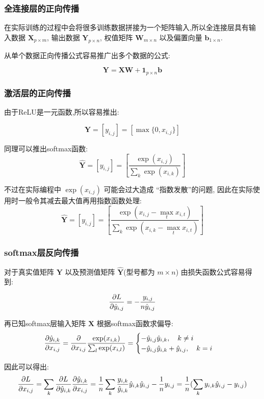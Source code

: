 \subsubsection{全连接层的正向传播}
在实际训练的过程中会将很多训练数据拼接为一个矩阵输入,所以全连接层具有输入数据 $\boldsymbol{X}_{p \times m}$, 输出数据 $\boldsymbol{Y}_{p \times n}$, 权值矩阵 $\boldsymbol{W}_{m \times n}$ 以及偏置向量 $\boldsymbol{b}_{1 \times n}.$

从单个数据正向传播公式容易推广出多个数据的公式:

$$\boldsymbol{Y} = \boldsymbol{XW} + \boldsymbol{1}_{p \times n} \boldsymbol{b}$$

\subsubsection{激活层的正向传播}

由于ReLU是一元函数,所以容易推出:

$$
\boldsymbol{Y} = [y_{i,j}] =  [\max\{0,x_{i,j}\}]
$$

同理可以推出softmax函数:
$$
\boldsymbol{\hat{Y}} = [y_{i,j}] = \left[\frac{\exp(x_{i,j})}{\sum_k \exp(x_{i,k})}\right]
$$

不过在实际编程中 $\exp(x_{i,j})$ 可能会过大造成 ``指数发散''的问题, 因此在实际使用时一般令其减去最大值再用指数函数处理:
$$
\boldsymbol{\hat{Y}} = [y_{i,j}] = \left[\frac{\exp(x_{i,j} - \max_t x_{i,t})}{\sum_k \exp(x_{i,k} - \max_t x_{i,t})}\right]
$$

\subsubsection{softmax层反向传播}
对于真实值矩阵 $\boldsymbol{Y}$ 以及预测值矩阵 $\boldsymbol{\hat{Y}}$(型号都为 $m \times n$) 由损失函数公式容易得到:

$$
\frac{\partial L}{\partial \hat{y}_{i,j}} = -\frac{y_{i,j}}{n\hat{y}_{i,j}}
$$

再已知softmax层输入矩阵 $\boldsymbol{X}$ 根据softmax函数求偏导:
$$
\frac{\partial \hat{y}_{i,k}}{\partial x_{i,j}} = \frac{\partial }{\partial x_{i,j}}\frac{\exp(x_{i,k })}{\sum_l \exp(x_{i,l})} = \begin{cases}
-\hat{y}_{i,j}\hat{y}_{i,k} ,\quad k \ne i \\
-\hat{y}_{i,j}\hat{y}_{i,k} + \hat{y}_{i,j} ,\quad k = i
\end{cases}
$$

因此可以得出:
$$
\frac{\partial L}{\partial x_{i,j}} =  \sum_k \frac{\partial L}{\partial \hat{y}_{i,k}} \frac{\partial \hat{y}_{i,k}}{\partial x_{i,j}} = \frac{1}{n} \sum_k \frac{y_{i,k}}{\hat{y}_{i,k}}\hat{y}_{i,k}\hat{y}_{i,j} - \frac{1}{n} y_{i,j} = \frac{1}{n}(\sum_k y_{i,k} \hat{y}_{i,j} - y_{i,j})
$$

